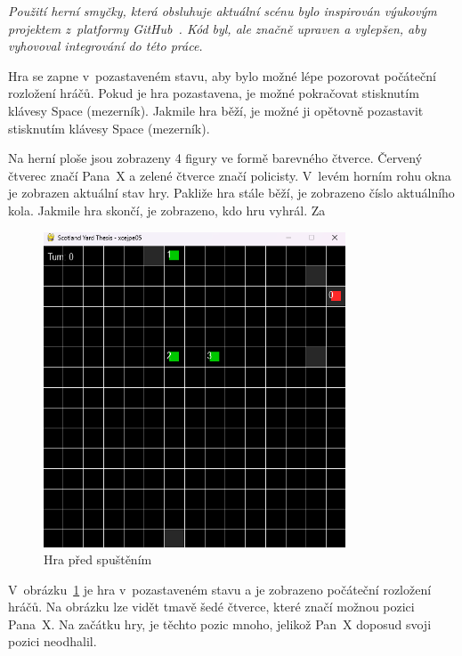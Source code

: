 \textit{Použití herní smyčky, která obsluhuje aktuální scénu bylo inspirován výukovým projektem z~platformy GitHub~\cite{GameSceneController}.
Kód byl, ale značně upraven a vylepšen, aby vyhovoval integrování do této práce.}

Hra se zapne v~pozastaveném stavu, aby bylo možné lépe pozorovat počáteční rozložení hráčů.
Pokud je hra pozastavena, je možné pokračovat stisknutím klávesy Space (mezerník).
Jakmile hra běží, je možné ji opětovně pozastavit stisknutím klávesy Space (mezerník).


Na herní ploše jsou zobrazeny 4 figury ve formě barevného čtverce.
Červený čtverec značí Pana~X a zelené čtverce značí policisty.
V~levém horním rohu okna je zobrazen aktuální stav hry.
Pakliže hra stále běží, je zobrazeno číslo aktuálního kola.
Jakmile hra skončí, je zobrazeno, kdo hru vyhrál.
Za 

\begin{figure}[H]
	\centering
	\includegraphics[width=0.8\textwidth]{obrazky-figures/game_0}
    \caption{Hra před spuštěním}
    \label{fig:game_0}
\end{figure}

V~obrázku~\ref{fig:game_0} je hra v~pozastaveném stavu a je zobrazeno počáteční rozložení hráčů.
Na obrázku lze vidět tmavě šedé čtverce, které značí možnou pozici Pana~X\@.
Na začátku hry, je těchto pozic mnoho, jelikož Pan~X doposud svoji pozici neodhalil.

